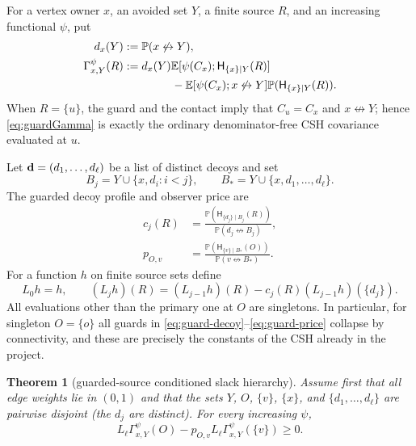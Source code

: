 \documentclass[11pt]{article}
\newtheorem{theorem}{Theorem}[section]
\theoremstyle{definition}
\theoremstyle{remark}
\newcommand{\PP}{\mathbb P}
\newcommand{\EE}{\mathbb E}
\newcommand{\ncon}{\not\leftrightarrow}
\begin{document}
For a vertex owner $x$, an avoided set $Y$, a finite source $R$, and an
increasing functional $\psi$, put
\begin{align}
 d_x(Y)&:=\PP(x\ncon Y),\label{eq:guard-denom}\\
 \Gamma_{x,Y}^{\psi}(R)
 &:=d_x(Y)\EE[\psi(C_x);\mathsf H_{\{x\}\mid Y}(R)]\notag\\
 &\hspace{1.5cm}-\EE[\psi(C_x);x\ncon Y]
       \PP(\mathsf H_{\{x\}\mid Y}(R)).\label{eq:guardGamma}
\end{align}
When $R=\{u\}$, the guard and the contact imply that $C_u=C_x$ and
$x\ncon Y$; hence \eqref{eq:guardGamma} is exactly the ordinary
denominator-free CSH covariance evaluated at $u$.

Let ${\bf d}=(d_1,\ldots,d_\ell)$ be a list of distinct decoys and set
\[
 B_j=Y\cup\{x,d_i:i<j\},\qquad
 B_*=Y\cup\{x,d_1,\ldots,d_\ell\}.
\]
The guarded decoy profile and observer price are
\begin{align}
 c_j(R)&=
 \frac{\PP(\mathsf H_{\{d_j\}\mid B_j}(R))}
      {\PP(d_j\ncon B_j)},\label{eq:guard-decoy}\\
 p_{O,v}&=
 \frac{\PP(\mathsf H_{\{v\}\mid B_*}(O))}
      {\PP(v\ncon B_*)}.
 \label{eq:guard-price}
\end{align}
For a function $h$ on finite source sets define
\begin{equation}\label{eq:guard-slack}
 L_0 h=h,\qquad
 (L_j h)(R)=(L_{j-1}h)(R)-c_j(R)(L_{j-1}h)(\{d_j\}).
\end{equation}
All evaluations other than the primary one at $O$ are singletons.  In
particular, for singleton $O=\{o\}$ all guards in
\eqref{eq:guard-decoy}--\eqref{eq:guard-price} collapse by connectivity,
and these are precisely the constants of the CSH already in the project.

\begin{theorem}[guarded-source conditioned slack hierarchy]
\label{thm:guardCSH}
Assume first that all edge weights lie in $(0,1)$ and that the sets
$Y$, $O$, $\{v\}$, $\{x\}$, and $\{d_1,\ldots,d_\ell\}$ are pairwise
disjoint (the $d_j$ are distinct).  For every increasing $\psi$,
\begin{equation}\label{eq:guardCSH}
 \boxed{\quad
 L_\ell\Gamma_{x,Y}^{\psi}(O)
 -p_{O,v}L_\ell\Gamma_{x,Y}^{\psi}(\{v\})\geq0.
 \quad}
\end{equation}
\end{theorem}
\end{document}
